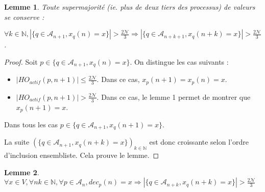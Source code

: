 \documentclass{article}
\newtheorem{lemma}{Lemme}
\begin{document}
\begin{lemma}

Toute supermajorité (ie. plus de deux tiers des processus) de valeurs se conserve :

	$\forall k \in \mathds{N}, | \{ q \in \mathcal{A}_{n+1} , x_q(n) = x \} | > \frac{2\mathcal{N}}{3} \Rightarrow | \{ q \in \mathcal{A}_{n+k+1} , x_q(n+k) = x \} | > \frac{2\mathcal{N}}{3}$.

\end{lemma}

\begin{proof}

Soit $p \in  \{ q \in \mathcal{A}_{n+1} , x_q(n) = x \} $. On distingue les cas suivants :

\begin{itemize}

\item $|HO_{actif} (p, n+1) | \leq \frac{2\mathcal{N}}{3}$. Dans ce cas, $x_p(n+1) = x_p(n) = x$.
\item $|HO_{actif} (p, n+1) | > \frac{2\mathcal{N}}{3}$. Dans ce cas, le lemme 1 permet de montrer que $x_p(n+1) = x$.

\end{itemize}
Dans tous les cas 
	$p \in \{ q \in \mathcal{A}_{n+1} , x_q(n+1) = x \} $.

	La suite $(\{ q \in \mathcal{A}_{n+1} , x_q(n+k) = x \})_{k \in \mathds{N}}$ est donc croissante selon l'ordre d'inclusion ensembliste. Cela prouve le lemme.
\end{proof}
\begin{lemma}
	$\forall x \in V, \forall n k \in \mathds{N}, \forall p \in \mathcal{A}_n, dec_p(n) = x \Rightarrow| \{ q \in \mathcal{A}_{n+k} , x_q(n+k) = x \} | > \frac{2\mathcal{N}}{3}$
\end{lemma}
\end{document}
